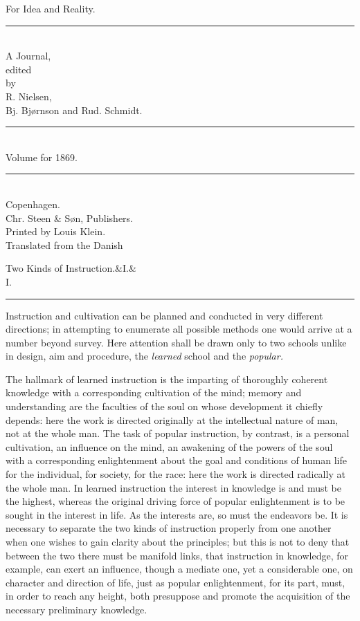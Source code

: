 \documentclass[12pt,a4paper,openany]{book}
\newcommand{\opage}[1]{\marginnote{\footnotesize\textit{[#1]}}}
\newcommand{\essayhead}[2]{\begin{center}{\large #1}\ifx&#2&\else\\[0.3em]{\normalsize #2}\fi\\[0.5em]\rule{3em}{0.4pt}\end{center}\medskip\noindent}
\begin{document}
\begin{titlepage}
\begin{center}
\vspace*{3em}
{\Huge For Idea and Reality.}\\[1em]
\rule{8em}{0.4pt}\\[1em]
{\large A Journal,}\\[0.8em]
{\small edited}\\[0.4em]
{\footnotesize by}\\[0.6em]
{\large R. Nielsen,}\\[0.4em]
{\large Bj. Bjørnson and Rud. Schmidt.}\\[1em]
\rule{8em}{0.4pt}\\[1em]
{\large Volume for 1869.}\\[1em]
\rule{8em}{0.4pt}\\[4em]
Copenhagen.\\[0.4em]
Chr. Steen \& Søn, Publishers.\\[1.5em]
{\small Printed by Louis Klein.}\\[3em]
{\small Translated from the Danish}
\end{center}
\end{titlepage}

\essayhead{Two Kinds of Instruction.}{I.}
\setcounter{footnote}{0}%
\opage{297}Instruction and cultivation can be planned and conducted in very different directions; in attempting
to enumerate all possible methods one would arrive at a number beyond survey. Here attention
shall be drawn only to two schools unlike
in design, aim and procedure,
the \emph{learned} school and the \emph{popular.}

The hallmark of learned instruction is the imparting
of thoroughly coherent knowledge
with a corresponding cultivation of the mind; memory and understanding are
the faculties of the soul on whose development it chiefly
depends: here the work is directed originally at the intellectual
nature of man, not at the whole man. The task
of popular instruction, by contrast, is a personal
cultivation, an influence on the mind, an awakening of the powers of the soul
with a corresponding enlightenment about the goal and conditions of human life
for the individual, for society, for
the race: here the work is directed radically at the whole man.
In learned instruction the interest in knowledge is and must
be the highest, whereas the original driving force of popular enlightenment
is to be sought in the interest in life. As the
interests are, so must the endeavors be. It is
\setcounter{footnote}{0}%
\opage{298}necessary to separate the two kinds of instruction properly
from one another when one wishes to gain clarity about the principles;
but this is not to deny that between
the two there must be manifold links, that instruction in knowledge,
for example, can exert an influence, though a mediate one,
yet a considerable one, on character and
direction of life, just as popular enlightenment, for its part,
must, in order to reach any height, both presuppose
and promote the acquisition of the necessary preliminary knowledge.
\end{document}
